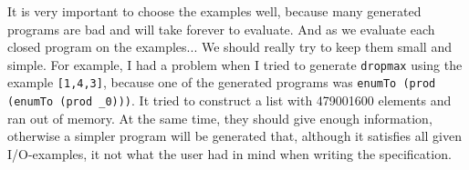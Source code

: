 It is very important to choose the examples well, because many generated programs are bad and will take forever to evaluate. And as we evaluate each closed program on the examples... We should really try to keep them small and simple.
For example, I had a problem when I tried to generate \lstinline?dropmax? using the example \lstinline?[1,4,3]?, because one of the generated programs was \lstinline?enumTo (prod (enumTo (prod _0)))?. It tried to construct a list with 479001600 elements and ran out of memory.
At the same time, they should give enough information, otherwise a simpler program will be generated that, although it satisfies all given I/O-examples, it not what the user had in mind when writing the specification.

